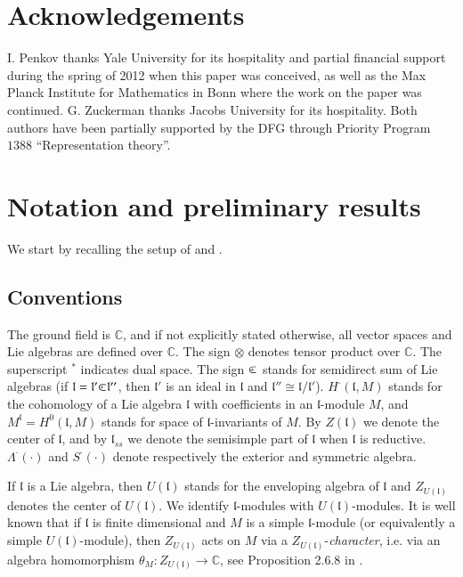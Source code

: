 \documentclass[default]{./styles/svmult}
\newcommand{\field}[1]{\mathbb{#1}}
\renewcommand{\ll}{\mathfrak{l}}
\def\clplus{\hbox{$\subset${\raise0.3ex\hbox{\kern -0.55em ${\scriptscriptstyle +}$}}\ }}
\begin{document}
\section*{Acknowledgements}\label{sect:acknow.}
I. Penkov thanks Yale University for its hospitality and partial financial support during the spring of 2012 when this paper was conceived, as well as the Max Planck Institute for Mathematics in Bonn where the work on the paper was continued. G. Zuckerman thanks Jacobs University for its hospitality. Both authors have been partially supported by the DFG through Priority Program $1388$ ``Representation theory''.
 
\vspace{2cm}
 
\section{Notation and preliminary results}\label{sect:1}
We start by recalling the setup of \cite{PZ2} and \cite{PZ5}.
\subsection{Conventions}\label{sect:1.1}

The ground field is $\field{C}$, and if not explicitly stated otherwise, all vector spaces and Lie algebras are defined over $\field{C}$. The sign $\otimes$ denotes tensor product over $\field{C}$. The superscript $^*$ indicates dual space. The sign $\clplus$ stands for semidirect sum of Lie algebras (if $\ll=\ll '\clplus\ll ''$, then $\ll '$ is an ideal in $\ll$ and $\ll ''\cong\ll /\ll '$). $H^\cdot(\ll,M)$ stands for the cohomology of a Lie algebra $\ll$ with coefficients in an $\ll$-module $M$, and $M^\ll=H^0(\ll,M)$ stands for space of $\ll$-invariants of $M$. By $Z(\ll)$ we denote the center of $\ll$, and by $\ll_{ss}$ we denote the semisimple part of $\ll$ when $\ll$ is reductive. $\Lambda^\cdot(\cdot)$ and $S^\cdot(\cdot)$ denote respectively the exterior and symmetric algebra.

If $\ll$ is a Lie algebra, then $U(\ll)$ stands for the enveloping algebra of $\ll$ and $Z_{U(\ll)}$ denotes the center of $U(\ll)$. We identify $\ll$-modules with $U(\ll)$-modules. It is well known that if $\ll$ is finite dimensional and $M$ is a simple $\ll$-module (or equivalently a simple $U(\ll)$-module), then $Z_{U(\ll)}$ acts on $M$ via a $Z_{U(\ll)}$-\textit{character}, i.e. via an algebra homomorphism $\theta_{M}: Z_{U(\ll)}\rightarrow\field{C}$, see Proposition 2.6.8 in \cite{Dix}.
\end{document}

